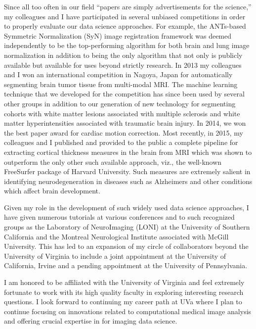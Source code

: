 \documentclass[12pt,]{article}
\begin{document}
Since all too often in our field ``papers are simply advertisements for
the science,'' my colleagues and I have participated in several unbiased
competitions in order to properly evaluate our data science approaches.
For example, the ANTs-based Symmetric Normalization (SyN) image
registration framework was deemed independently to be the top-performing
algorithm for both brain and lung image normalization in addition to
being the only algorithm that not only is publicly available but
available for uses beyond strictly research. In 2013 my colleagues and I
won an international competition in Nagoya, Japan for automatically
segmenting brain tumor tissue from multi-modal MRI. The machine learning
technique that we developed for the competition has since been used by
several other groups in addition to our generation of new technology for
segmenting cohorts with white matter lesions associated with multiple
sclerosis and white matter hyperintensities associated with traumatic
brain injury. In 2014, we won the best paper award for cardiac motion
correction. Most recently, in 2015, my colleagues and I published and
provided to the public a complete pipeline for extracting cortical
thickness measures in the brain from MRI which was shown to outperform
the only other such available approach, viz., the well-known FreeSurfer
package of Harvard University. Such measures are extremely salient in
identifying neurodegeneration in diseases such as Alzheimers and other
conditions which affect brain development.

Given my role in the development of such widely used data science
approaches, I have given numerous tutorials at various conferences and
to such recognized groups as the Laboratory of NeuroImaging (LONI) at
the University of Southern California and the Montreal Neurological
Institute associated with McGill University. This has led to an
expansion of my circle of collaborators beyond the University of
Virginia to include a joint appointment at the University of California,
Irvine and a pending appointment at the University of Pennsylvania.

I am honored to be affiliated with the University of Virginia and feel
extremely fortunate to work with its high quality faculty in exploring
interesting research questions. I look forward to continuing my career
path at UVa where I plan to continue focusing on innovations related to
computational medical image analysis and offering crucial expertise in
for imaging data science.
\end{document}
